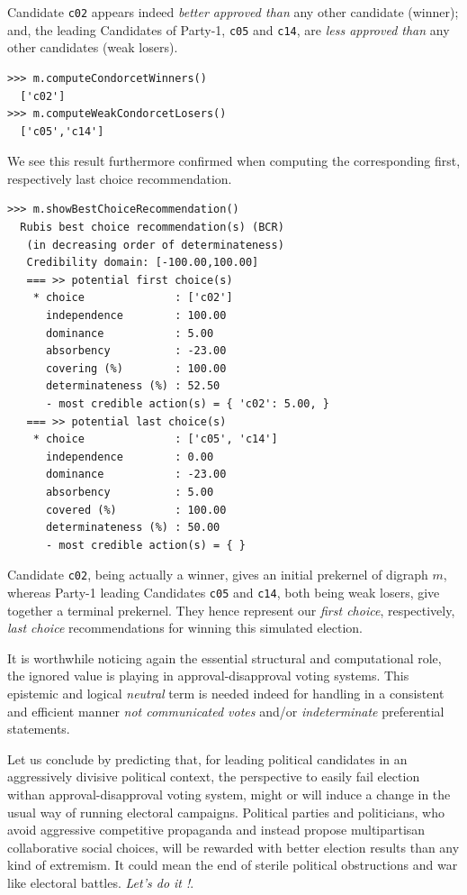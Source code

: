 Candidate \texttt{c02} appears indeed \emph{better approved than} any other candidate (\Condorcet winner); and, the leading Candidates of Party-1, \texttt{c05} and \texttt{c14}, are \emph{less approved than} any other candidates (weak \Condorcet losers).
\begin{lstlisting}
>>> m.computeCondorcetWinners()
  ['c02']
>>> m.computeWeakCondorcetLosers()
  ['c05','c14']
\end{lstlisting}

We see this result furthermore confirmed when computing the corresponding first, respectively last choice recommendation.    
\begin{lstlisting}
>>> m.showBestChoiceRecommendation()
  Rubis best choice recommendation(s) (BCR)
   (in decreasing order of determinateness)   
   Credibility domain: [-100.00,100.00]
   === >> potential first choice(s)
    * choice              : ['c02']
      independence        : 100.00
      dominance           : 5.00
      absorbency          : -23.00
      covering (%)        : 100.00
      determinateness (%) : 52.50
      - most credible action(s) = { 'c02': 5.00, }
   === >> potential last choice(s) 
    * choice              : ['c05', 'c14']
      independence        : 0.00
      dominance           : -23.00
      absorbency          : 5.00
      covered (%)         : 100.00
      determinateness (%) : 50.00
      - most credible action(s) = { }
\end{lstlisting}

Candidate \texttt{c02}, being actually a \Condorcet winner, gives an initial prekernel of digraph $m$, whereas Party-1 leading Candidates \texttt{c05} and \texttt{c14}, both being weak \Condorcet losers, give together a terminal prekernel. They hence represent our \emph{first choice}, respectively, \emph{last choice} recommendations for winning this simulated election.

It is worthwhile noticing again the essential structural and computational role, the ignored value is playing in approval-disapproval voting systems. This epistemic and logical \emph{neutral} term is needed indeed for handling in a consistent and efficient manner \emph{not communicated votes} and/or \emph{indeterminate} preferential statements.

Let us conclude by predicting that, for leading political candidates in an aggressively divisive political context, the perspective to easily fail election withan approval-disapproval voting system, might or will induce a change in the usual way of running electoral campaigns. Political parties and politicians, who avoid aggressive competitive propaganda and instead propose multipartisan collaborative social choices, will be rewarded with better election results than any kind of extremism. It could mean the end of sterile political obstructions and war like electoral battles. \emph{Let's do it !}.

 
%


